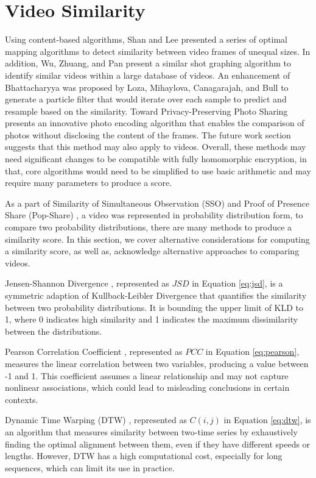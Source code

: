 \section{Video Similarity}

Using content-based algorithms, Shan and Lee \cite{Shan2002-sfs} presented a series of optimal mapping algorithms to detect similarity between video frames of unequal sizes. In addition, Wu, Zhuang, and Pan \cite{Wu2000-nf} present a similar shot graphing algorithm to identify similar videos within a large database of videos. An enhancement of Bhattacharyya was proposed by Loza, Mihaylova, Canagarajah, and Bull \cite{Loza2006-sso} to generate a particle filter that would iterate over each sample to predict and resample based on the similarity. Toward Privacy-Preserving Photo Sharing \cite{Ra2013-p3} presents an innovative photo encoding algorithm that enables the comparison of photos without disclosing the content of the frames. The future work section suggests that this method may also apply to videos. Overall, these methods may need significant changes to be compatible with fully homomorphic encryption, in that, core algorithms would need to be simplified to use basic arithmetic and may require many parameters to produce a score.

As a part of Similarity of Simultaneous Observation (SSO) \cite{Wu2019-SSO} and Proof of Presence Share (Pop-Share) \cite{Lagesse2021-PopShare}, a video was represented in probability distribution form, to compare two probability distributions, there are many methods to produce a similarity score. In this section, we cover alternative considerations for computing a similarity score, as well as, acknowledge alternative approaches to comparing videos.

Jensen-Shannon Divergence \cite{Lin1991-jsd}, represented as $JSD$ in Equation \ref{eq:jsd}, is a symmetric adaption of Kullback-Leibler Divergence that quantifies the similarity between two probability distributions. It is bounding the upper limit of KLD to 1, where 0 indicates high similarity and 1 indicates the maximum dissimilarity between the distributions.



Pearson Correlation Coefficient \cite{Pearson1896-hp}, represented as $PCC$ in Equation \ref{eq:pearson}, measures the linear correlation between two variables, producing a value between -1 and 1. This coefficient assumes a linear relationship and may not capture nonlinear associations, which could lead to misleading conclusions in certain contexts. 



Dynamic Time Warping (DTW) \cite{Sakoe1978-dtw}, represented as $C(i,j)$ in Equation \ref{eq:dtw}, is an algorithm that measures similarity between two-time series by exhaustively finding the optimal alignment between them, even if they have different speeds or lengths. However, DTW has a high computational cost, especially for long sequences, which can limit its use in practice. 


